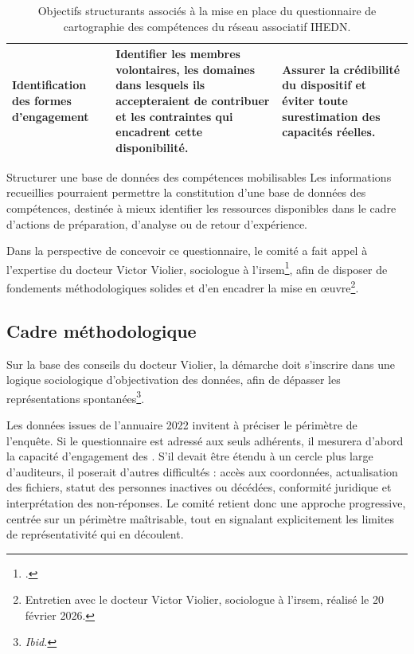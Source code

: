 \begin{table}[H]
{\begin{tabular}{@{}>{\raggedright\arraybackslash}p{4cm}>{\raggedright\arraybackslash}p{7.5cm}>{\raggedright\arraybackslash}p{5.5cm}@{}}
\addlinespace

Identification des formes d'engagement &
Identifier les membres volontaires, les domaines dans lesquels ils accepteraient de contribuer et les contraintes qui encadrent cette disponibilité. &
Assurer la crédibilité du dispositif et éviter toute surestimation des capacités réelles. \\

\bottomrule
\end{tabular}
}

\caption[Objectifs structurants du questionnaire]{Objectifs structurants associés à la mise en place du questionnaire de cartographie des compétences du réseau associatif IHEDN.}
\label{tab:objectifs_questionnaire}

\end{table}

\begin{subproposition}{Structurer une base de données des compétences mobilisables}
Les informations recueillies pourraient permettre la constitution d'une base de données des compétences, destinée à mieux identifier les ressources disponibles dans le cadre d'actions de préparation, d'analyse ou de retour d'expérience.
\end{subproposition}

Dans la perspective de concevoir ce questionnaire, le comité a fait appel à l'expertise du docteur Victor Violier, sociologue à l'\gls{irsem}\footcite{violier_irsem}, afin de disposer de fondements méthodologiques solides et d'en encadrer la mise en \oe{}uvre\footnote{Entretien avec le docteur Victor Violier, sociologue à l'\gls{irsem}, réalisé le 20 février 2026.}.

\subsection{Cadre méthodologique}

Sur la base des conseils du docteur Violier, la démarche doit s'inscrire dans une logique sociologique d'objectivation des données, afin de dépasser les représentations spontanées\footnote{\textit{Ibid.}}.

Les données issues de l'annuaire 2022 invitent à préciser le périmètre de l'enquête. Si le questionnaire est adressé aux seuls adhérents, il mesurera d'abord la capacité d'engagement des \AssociationsUnionIHEDN. S'il devait être étendu à un cercle plus large d'auditeurs, il poserait d'autres difficultés : accès aux coordonnées, actualisation des fichiers, statut des personnes inactives ou décédées, conformité juridique et interprétation des non-réponses. Le comité retient donc une approche progressive, centrée sur un périmètre maîtrisable, tout en signalant explicitement les limites de représentativité qui en découlent.

